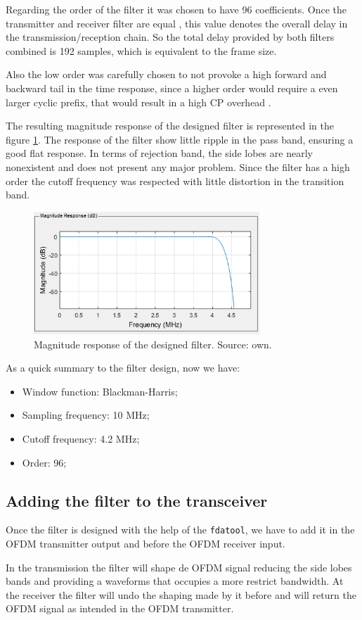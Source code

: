 Regarding the order of the filter it was chosen to have 96 coefficients. Once the transmitter and receiver filter are equal \cite{al2020improving}, this value denotes the overall delay in the transmission/reception chain. So the total delay provided by both filters combined is 192 samples, which is equivalent to the frame size. 

Also the low order was carefully chosen to not provoke a high forward and backward tail in the time response, since a higher order would require a even larger cyclic prefix, that would result in a high CP overhead \cite{zhang2015filtered}. 

The resulting magnitude response of the designed filter is represented in the figure \ref{fig:filter}. The response of the filter show little ripple in the pass band, ensuring a good flat response. In terms of rejection band, the side lobes are nearly nonexistent and does not present any major problem. Since the filter has a high order the cutoff frequency was respected with little distortion in the transition band.



\begin{figure}[h]
\begin{center}
\includegraphics[width=8.5cm]{images/filter.png}
\caption{Magnitude response of the designed filter. Source: own.}
\label{fig:filter} 
\end{center}
\end{figure}

As a quick summary to the filter design, now we have:
\begin{itemize}
    \item Window function: Blackman-Harris;
    \item Sampling frequency: 10 MHz;
    \item Cutoff frequency: 4.2 MHz;
    \item Order: 96;
\end{itemize}

\subsection{Adding the filter to the transceiver}

Once the filter is designed with the help of the \texttt{fdatool}, we have to add it in the OFDM transmitter output and before the OFDM receiver input. 

In the transmission the filter will shape de OFDM signal reducing the side lobes bands and providing a waveforms that occupies a more restrict bandwidth. At the receiver the filter will undo the shaping made by it before and will return the OFDM signal as intended in the OFDM transmitter.
